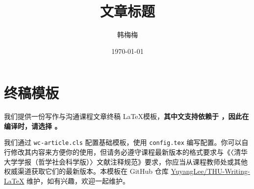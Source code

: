 \documentclass{wc-article}
\title{文章标题}
\author{韩梅梅}
\date{\today}
\begin{document}
\onehalfspacing

\thispagestyle{empty}


\newpage

\setcounter{page}{1}

\maketitle



\section{终稿模板}

我们提供一份写作与沟通课程文章终稿 \LaTeX 模板，\textbf{其中文支持依赖于 \CTeX，因此在编译时，请选择 \XeLaTeX。}

我们通过 \texttt{wc-article.cls} 配置基础模板，使用 \texttt{config.tex} 编写配置。你可以自行修改其内容来方便你的使用，但请务必遵守课程最新版本的格式要求与《〈清华大学学报（哲学社会科学版）〉文献注释规范》要求，你应当从课程教师处或其他权威渠道获取它们的最新版本。本模板在 GitHub 仓库 \href{https://github.com/YuyangLee/THU-Writing-LaTeX}{YuyangLee/THU-Writing-LaTeX} 维护，如有兴趣，欢迎一起维护。
\end{document}
